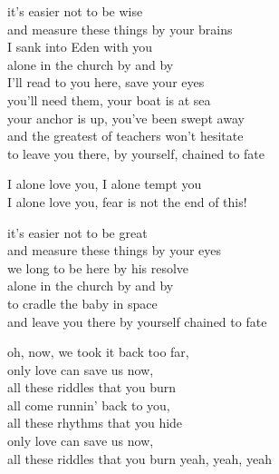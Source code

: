  


\beginverse
it's easier not to be wise	\\
and measure these things by your brains	\\
I sank into Eden with you	\\
alone in the church by and by	\\
I'll read to you here, save your eyes	\\
you'll need them, your boat is at sea	\\
your anchor is up, you've been swept away	\\
and the greatest of teachers won't hesitate	\\
to leave you there, by yourself, chained to fate
\endverse


\beginverse
I alone love you,	\brk I alone tempt you	\\
I alone love you,	\brk fear is not the end of this!	
\endverse


\beginverse
it's easier not to be great	\\
and measure these things by your eyes	\\
we long to be here by his resolve	\\
alone in the church by and by	\\
to cradle the baby in space	\\
and leave you there by yourself chained to fate	
\endverse


\beginverse
oh, now, we took it back too far,	\\
only love can save us now,	\\
all these riddles that you burn	\\
all come runnin' back to you,	\\
all these rhythms that you hide	\\
only love can save us now,	\\
all these riddles that you burn yeah, yeah, yeah	
\endverse




\endsong

